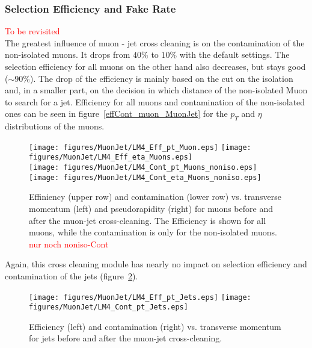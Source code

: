 \documentclass{cmspaper}
\begin{document}
\subsubsection{Selection Efficiency and Fake Rate}

\textcolor{red}{To be revisited}\\
The greatest influence of muon - jet cross cleaning is on the contamination of
the non-isolated muons. It drops from \(40 \%\) to \(10 \%\) with the default settings. The
selection efficiency for all muons on the other hand also decreases, but stays good (\(\sim
90\%\)). The drop of the efficiency is mainly based on the cut on the isolation and, in a smaller part, on the decision in which distance of the non-isolated Muon to search for a jet. Efficiency for all muons and contamination of the non-isolated ones can be seen in figure~\ref{effCont_muon_MuonJet} for the \(p_T\)
and \(\eta\) distributions of the muons. 

\begin{figure}[hb]
\begin{center}
    \texttt{[image: figures/MuonJet/LM4\_Eff\_pt\_Muon.eps]}
    \texttt{[image: figures/MuonJet/LM4\_Eff\_eta\_Muons.eps]}\\
    \texttt{[image: figures/MuonJet/LM4\_Cont\_pt\_Muons\_noniso.eps]}
    \texttt{[image: figures/MuonJet/LM4\_Cont\_eta\_Muons\_noniso.eps]}
    \caption{Effiniency (upper row) and contamination (lower row) vs. transverse
    momentum (left) and pseudorapidity (right) for muons before and after the
    muon-jet cross-cleaning. The Efficiency is shown for all muons, while the contamination is only for the non-isolated muons. \textcolor{red}{nur noch noniso-Cont}}
\label{fig:effCont_muon_MuonJet}
\end{center}
\end{figure}

Again, this cross cleaning module has nearly no impact on selection efficiency
and contamination of the jets (figure~\ref{fig:effCont_Jets_MuonJet}).

\begin{figure}[hb]
\begin{center}
    \texttt{[image: figures/MuonJet/LM4\_Eff\_pt\_Jets.eps]}
    \texttt{[image: figures/MuonJet/LM4\_Cont\_pt\_Jets.eps]}
    \caption{Efficiency (left) and contamination (right) vs. transverse momentum
    for jets before and after the muon-jet cross-cleaning.}
\label{fig:effCont_Jets_MuonJet}
\end{center}
\end{figure}
\end{document}
